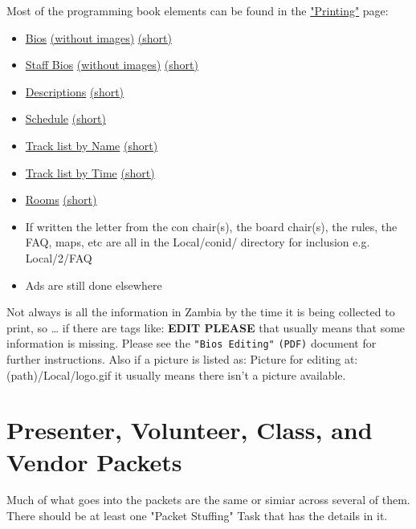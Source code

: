 \documentclass[captions=tablesignature]{scrartcl}
\begin{document}
Most of the programming book elements can be found in the \href{../webpages/PreconPrinting.php}{"Printing"}
page:
\begin{itemize}
\item \href{../webpages/BookBios.php}{Bios} \href{../webpages/BookBios.php?pic_p=N}{(without images)} \href{../webpages/BookBios.php?short=Y}{(short)}
\item \href{../webpages/BookStaffBios.php}{Staff Bios} \href{../webpages/BookStaffBios.php?pic_p=N}{(without images)} \href{../webpages/BookStaffBios.php?short=Y}{(short)}
\item \href{../webpages/BookSched.php?format=desc}{Descriptions} \href{../webpages/BookSched.php?format=desc&short=Y}{(short)}
\item \href{../webpages/BookSched.php?format=sched}{Schedule} \href{../webpages/BookSched.php?format=sched&short=Y}{(short)}
\item \href{../webpages/BookSched.php?format=tracks}{Track list by Name} \href{../webpages/BookSched.php?format=tracks&short=N}{(short)}
\item \href{../webpages/BookSched.php?format=trtime}{Track list by Time} \href{../webpages/BookSched.php?format=trtime&short=Y}{(short)}
\item \href{../webpages/BookSched.php?format=rooms}{Rooms} \href{../webpages/BookSched.php?format=rooms&short=Y}{(short)}
\item If written the letter from the con chair(s), the board chair(s),
the rules, the FAQ, maps, etc are all in the Local/conid/
directory for inclusion e.g. Local/2/FAQ
\item Ads are still done elsewhere
\end{itemize}

Not always is all the information in Zambia by the time it is being
collected to print, so \ldots{} if there are tags like: \textbf{\textbf{\textbf{EDIT PLEASE}}}
that usually means that some information is missing.  Please see the
\texttt{"Bios Editing"} \texttt{(PDF)} document for further instructions.  Also if a
picture is listed as: Picture for editing at: (path)/Local/logo.gif
it usually means there isn't a picture available.

\section{Presenter, Volunteer, Class, and Vendor Packets}
\label{sec-4}

Much of what goes into the packets are the same or simiar across
several of them.  There should be at least one "Packet Stuffing"
Task that has the details in it.
\end{document}
